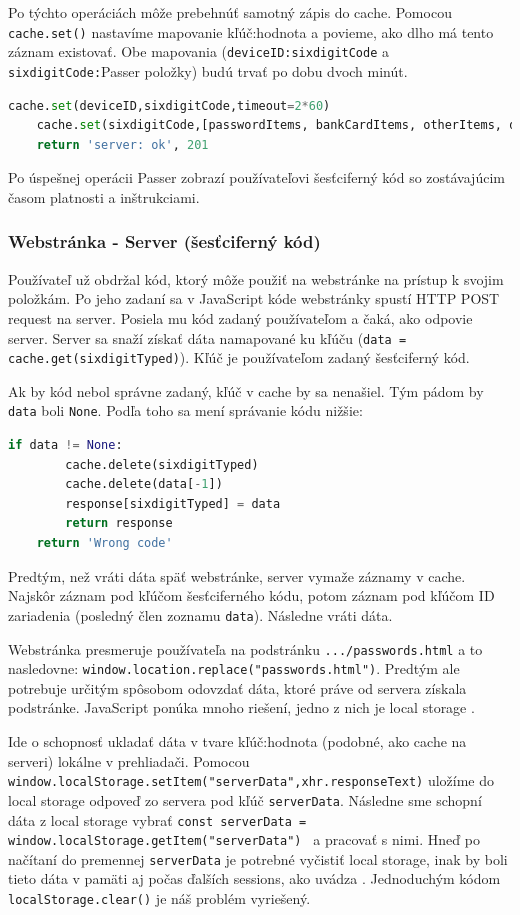 Po týchto operáciách môže prebehnúť samotný zápis do cache. Pomocou \texttt{cache.set()} nastavíme mapovanie kľúč:hodnota a povieme, ako dlho má tento záznam existovať. Obe mapovania (\texttt{deviceID:sixdigitCode} a \texttt{sixdigitCode:}Passer položky) budú trvať po dobu dvoch minút.
\begin{lstlisting}[language=Python, basicstyle=\small]
    cache.set(deviceID,sixdigitCode,timeout=2*60)
    cache.set(sixdigitCode,[passwordItems, bankCardItems, otherItems, deviceID],timeout=2*60)
    return 'server: ok', 201
\end{lstlisting}

Po úspešnej operácii Passer zobrazí používateľovi šesťciferný kód so zostávajúcim časom platnosti a inštrukciami.
\subsubsection{Webstránka - Server (šesťciferný kód)}
Používateľ už obdržal kód, ktorý môže použiť na webstránke na prístup k svojim položkám. Po jeho zadaní sa v JavaScript kóde webstránky spustí HTTP POST request na server. Posiela mu kód zadaný používateľom a čaká, ako odpovie server. Server sa snaží získať dáta namapované ku kľúču (\texttt{data = cache.get(sixdigitTyped)}). Kľúč je používateľom zadaný šesťciferný kód. 

Ak by kód nebol správne zadaný, kľúč v cache by sa nenašiel. Tým pádom by \texttt{data} boli \texttt{None}. Podľa toho sa mení správanie kódu nižšie: 
\begin{lstlisting}[language=Python, basicstyle=\small]
    if data != None:
        cache.delete(sixdigitTyped)
        cache.delete(data[-1])
        response[sixdigitTyped] = data
        return response
    return 'Wrong code'
\end{lstlisting}

Predtým, než vráti dáta späť webstránke, server vymaže záznamy v cache. Najskôr záznam pod kľúčom šesťciferného kódu, potom záznam pod kľúčom ID zariadenia (posledný člen zoznamu \texttt{data}). Následne vráti dáta.

Webstránka presmeruje používateľa na podstránku \texttt{.../passwords.html} a to nasledovne: \texttt{window.location.replace("passwords.html")}. Predtým ale potrebuje určitým spôsobom odovzdať dáta, ktoré práve od servera získala podstránke. JavaScript ponúka mnoho riešení, jedno z nich je local storage \cite{localstorage}.

\begin{sloppypar}
    Ide o schopnosť ukladať dáta v tvare kľúč:hodnota (podobné, ako cache na serveri) lokálne v prehliadači. Pomocou \texttt{window.localStorage.setItem("serverData",xhr.responseText)} uložíme do local storage odpoveď zo servera pod kľúč \texttt{serverData}. Následne sme schopní dáta z local storage vybrať \texttt{const serverData = window.localStorage.getItem("serverData")
    } a pracovať s nimi. Hneď po načítaní do premennej \texttt{serverData} je potrebné vyčistiť local storage, inak by boli tieto dáta v pamäti aj počas ďalších sessions, ako uvádza \cite{localstorage}. Jednoduchým kódom \texttt{localStorage.clear()} je náš problém vyriešený.
\end{sloppypar}

